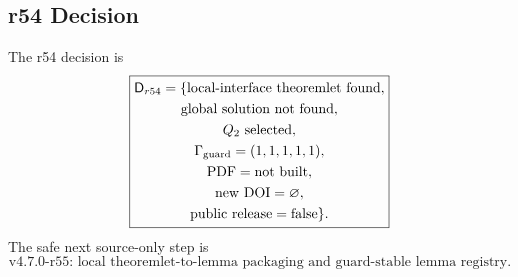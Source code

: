 \begin{samepage}
\subsection{r54 Decision}
\label{subsec:r54-decision}

The r54 decision is
\[
\boxed{
\begin{gathered}
\mathsf D_{r54}
=
\{
\text{local-interface theoremlet found},\\
\text{global solution not found},\\
Q_2\text{ selected},\\
\Gamma_{\rm guard}=(1,1,1,1,1),\\
\mathrm{PDF}=\mathrm{not\ built},\\
\mathrm{new\ DOI}=\varnothing,\\
\mathrm{public\ release}=\mathrm{false}
\}.
\end{gathered}
}
\]
The safe next source-only step is
\[
\boxed{
\text{v4.7.0-r55: local theoremlet-to-lemma packaging and guard-stable lemma registry.}
}
\]
\end{samepage}








\clearpage
